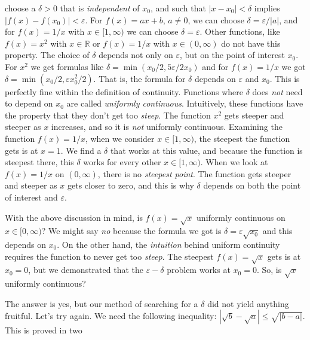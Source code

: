 \documentclass{article}
\theoremstyle{normal}
\theoremstyle{plain}
\begin{document}
    choose a $\delta>0$ that is \textit{independent} of $x_{0}$, and such that
    $|x-x_{0}|<\delta$ implies $|f(x)-f(x_{0})|<\varepsilon$. For
    $f(x)=ax+b$, $a\ne{0}$, we can choose $\delta=\varepsilon/|a|$, and for
    $f(x)=1/x$ with $x\in[1,\infty)$ we can choose
    $\delta=\varepsilon$. Other functions, like $f(x)=x^{2}$ with
    $x\in\mathbb{R}$ or $f(x)=1/x$ with $x\in(0,\infty)$ do not have this
    property. The choice of $\delta$ depends not only on $\varepsilon$, but on
    the point of interest $x_{0}$. For $x^{2}$ we get formulas like
    $\delta=\min(x_{0}/2,5\varepsilon/2x_{0})$ and for $f(x)=1/x$ we got
    $\delta=\min(x_{0}/2,\varepsilon{x}_{0}^{2}/2)$. That is, the formula
    for $\delta$ depends on $\varepsilon$ and $x_{0}$. This is perfectly fine
    within the definition of continuity. Functions where $\delta$ does
    \textit{not} need to depend on $x_{0}$ are called
    \textit{uniformly continuous}. Intuitively, these functions have the
    property that they don't get too \textit{steep}. The function
    $x^{2}$ gets steeper and steeper as $x$ increases, and so it is
    \textit{not} uniformly continuous. Examining the function $f(x)=1/x$,
    when we consider $x\in[1,\infty)$, the steepest the function gets is at
    $x=1$. We find a $\delta$ that works at this value, and because the
    function is steepest there, this $\delta$ works for every other
    $x\in[1,\infty)$. When we look at $f(x)=1/x$ on $(0,\infty)$, there is no
    \textit{steepest point}. The function gets steeper and steeper as $x$ gets
    closer to zero, and this is why $\delta$ depends on both the point of
    interest and $\varepsilon$.
    \par\hfill\par
    With the above discussion in mind, is $f(x)=\sqrt{x}$ uniformly continuous
    on $x\in[0,\infty)$? We might say \textit{no} because the formula we got
    is $\delta=\varepsilon\sqrt{x_{0}}$ and this depends on $x_{0}$. On the
    other hand, the \textit{intuition} behind uniform continuity requires the
    function to never get too \textit{steep}. The steepest $f(x)=\sqrt{x}$
    gets is at $x_{0}=0$, but we demonstrated that the $\varepsilon-\delta$
    problem works at $x_{0}=0$. So, is $\sqrt{x}$ uniformly continuous?
    \par\hfill\par
    The answer is yes, but our method of searching for a $\delta$ did not
    yield anything fruitful. Let's try again. We need the following
    inequality: $|\sqrt{b}-\sqrt{a}|\leq\sqrt{|b-a|}$. This is proved in two
\end{document}
